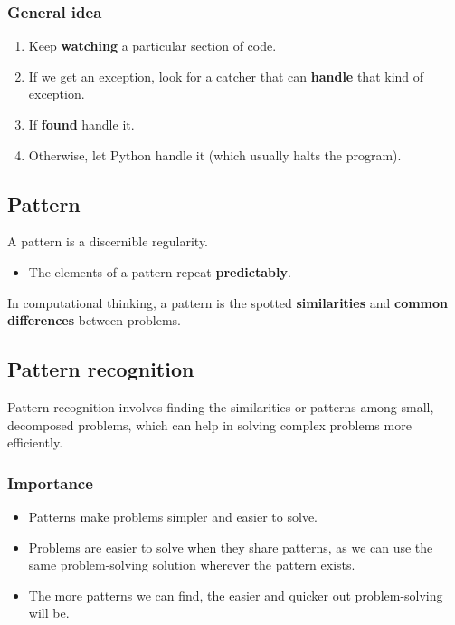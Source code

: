 \documentclass[11pt]{article}
\begin{document}
\subsubsection{General idea}
\label{sec:org40c90af}
\begin{enumerate}
\item Keep \textbf{watching} a particular section of code.
\item If we get an exception, look for a catcher that can \textbf{handle} that kind of exception.
\item If \textbf{found} handle it.
\item Otherwise, let Python handle it (which usually halts the program).
\end{enumerate}

\subsection{Pattern}
\label{sec:orgead2f0f}
A pattern is a discernible regularity.
\begin{itemize}
\item The elements of a pattern repeat \textbf{predictably}.
\end{itemize}

In computational thinking, a pattern is the spotted \textbf{similarities} and \textbf{common differences} between problems.

\subsection{Pattern recognition}
\label{sec:org2630abe}
Pattern recognition involves finding the similarities or patterns among small, decomposed problems, which can help in solving complex problems more efficiently.

\subsubsection{Importance}
\label{sec:org140e2be}
\begin{itemize}
\item Patterns make problems simpler and easier to solve.
\item Problems are easier to solve when they share patterns, as we can use the same problem-solving solution wherever the pattern exists.
\item The more patterns we can find, the easier and quicker out problem-solving will be.
\end{itemize}
\end{document}
